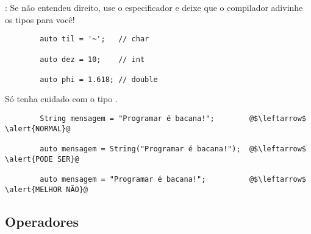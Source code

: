 \begin{frame}[fragile]{\insertsection: \insertsubsection}
	Se não entendeu direito, use o especificador \texttt{} e deixe que o compilador adivinhe os tipos para você!
	\begin{verbatim}
		auto til = '~';   // char

		auto dez = 10;    // int

		auto phi = 1.618; // double
	\end{verbatim}

	\pause
	\bigskip
	Só tenha cuidado com o tipo \texttt{}.
	\begin{verbatim}
		String mensagem = "Programar é bacana!";        @$\leftarrow$ \alert{NORMAL}@

		auto mensagem = String("Programar é bacana!");  @$\leftarrow$ \alert{PODE SER}@

		auto mensagem = "Programar é bacana!";          @$\leftarrow$ \alert{MELHOR NÃO}@
	\end{verbatim}
\end{frame}


\subsection{Operadores}


